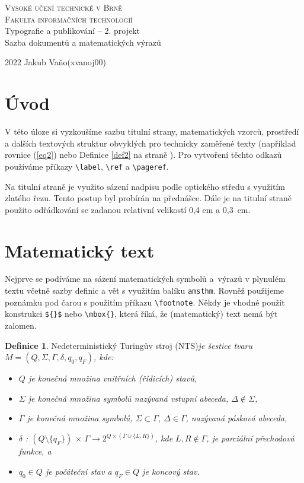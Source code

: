 \documentclass[11pt,twocolumn,a4paper]{article}
\theoremstyle{definition}
\newtheorem{definition}{Definice}
\begin{document}
\begin{titlepage}
\begin{center}
    \Huge\textsc{Vysoké učení technické v Brně}\\
    \huge\textsc{Fakulta informačních technologií}\\
    Typografie a publikování -- 2. projekt\\Sazba dokumentů a matematických výrazů
\end{center}
{\Large 2022 \hfill Jakub Vaňo(xvanoj00)}
\end{titlepage}

\section*{Úvod}
V této úloze si vyzkoušíme sazbu titulní strany, matematických vzorců, prostředí a dalších textových struktur obvyklých pro technicky zaměřené texty (například rovnice (\ref{eq2}) nebo Definice \ref{def2} na straně \pageref{def2}). Pro vytvoření těchto odkazů používáme příkazy \verb|\label|, \verb|\ref| a \verb|\pageref|.

Na titulní straně je využito sázení nadpisu podle optického středu s využitím zlatého řezu. Tento postup byl probírán na přednášce. Dále je na titulní straně použito odřádkování se zadanou relativní velikostí 0,4 em a 0,3~em.

\section{Matematický text}
Nejprve se podíváme na sázení matematických symbolů a~výrazů v plynulém textu včetně sazby definic a vět s využitím balíku \texttt{amsthm}. Rovněž použijeme poznámku pod čarou s použitím příkazu \verb|\footnote|. Někdy je vhodné použít konstrukci \verb|${}$| nebo \verb|\mbox{}|, která říká, že (matematický) text nemá být zalomen. 

\begin{definition}
\label{def1}
Nedeterministický Turingův stroj (NTS)\emph{je šestice tvaru ${M=(Q,\Sigma,\Gamma,\delta,q_0,q_F)}$, kde:}
\begin{itemize}
    \item \emph{$Q$ je konečná množina \textnormal{vnitřních (řídicích) stavů},}
    \item \emph{$\Sigma$ je konečná množina symbolů nazývaná \textnormal{vstupní abeceda}, $\Delta\not\in\Sigma$,}
    \item \emph{$\Gamma$ je konečná množina symbolů, $\Sigma\subset\Gamma$, $\Delta\in\Gamma$, nazývaná \textnormal{pásková abeceda},}
    \item \emph{$\delta$ : $(Q \setminus \{q_F\})\,\times\,\Gamma \rightarrow 2^{Q\times(\Gamma\cup\{L,R\})}$, kde $L,R \not\in\Gamma$, je parciální \textnormal{přechodová funkce}, a}
    \item \emph{$q_0\in Q$ je \textnormal{počáteční stav} a $q_F\in Q$ je \textnormal{koncový stav}.}
\end{itemize}
\end{definition}
\end{document}
